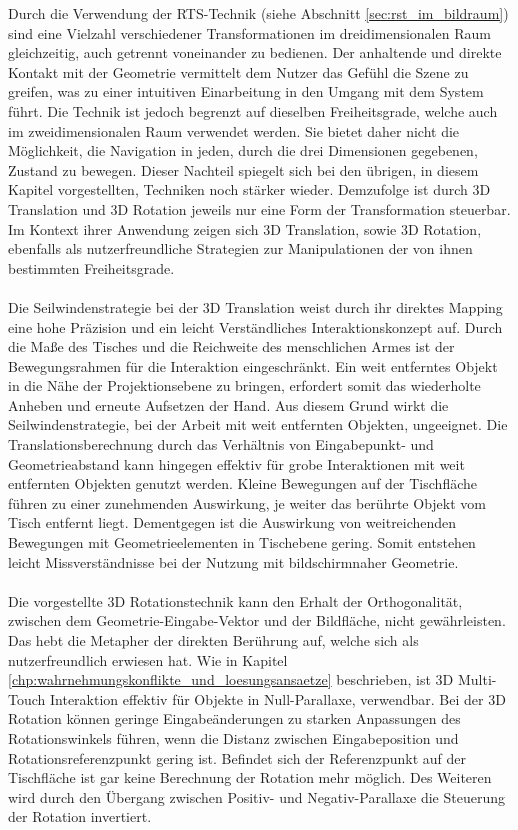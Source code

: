Durch die Verwendung der RTS-Technik (siehe Abschnitt \ref{sec:rst_im_bildraum}) sind eine Vielzahl verschiedener Transformationen im dreidimensionalen Raum gleichzeitig, auch getrennt voneinander zu bedienen. Der anhaltende und direkte Kontakt mit der Geometrie vermittelt dem Nutzer das Gefühl die Szene zu greifen, was zu einer intuitiven Einarbeitung in den Umgang mit dem System führt. Die Technik ist jedoch begrenzt auf dieselben Freiheitsgrade, welche auch im zweidimensionalen Raum verwendet werden. Sie bietet daher nicht die Möglichkeit, die Navigation in jeden, durch die drei Dimensionen gegebenen, Zustand zu bewegen. Dieser Nachteil spiegelt sich bei den übrigen, in diesem Kapitel vorgestellten, Techniken noch stärker wieder. Demzufolge ist durch 3D Translation und 3D Rotation jeweils nur eine Form der Transformation steuerbar. Im Kontext ihrer Anwendung zeigen sich 3D Translation, sowie 3D Rotation, ebenfalls als nutzerfreundliche Strategien zur Manipulationen der von ihnen bestimmten Freiheitsgrade.
\\\\
Die Seilwindenstrategie bei der 3D Translation weist durch ihr direktes Mapping eine hohe Präzision und ein leicht Verständliches Interaktionskonzept auf. Durch die Maße des Tisches und die Reichweite des menschlichen Armes ist der Bewegungsrahmen für die Interaktion eingeschränkt. Ein weit entferntes Objekt in die Nähe der Projektionsebene zu bringen, erfordert somit das wiederholte Anheben und erneute Aufsetzen der Hand. Aus diesem Grund wirkt die Seilwindenstrategie, bei der Arbeit mit weit entfernten Objekten, ungeeignet. Die Translationsberechnung durch das Verhältnis von Eingabepunkt- und Geometrieabstand kann hingegen effektiv für grobe Interaktionen mit weit entfernten Objekten genutzt werden. Kleine Bewegungen auf der Tischfläche führen zu einer zunehmenden Auswirkung, je weiter das berührte Objekt vom Tisch entfernt liegt. Dementgegen ist die Auswirkung von weitreichenden Bewegungen mit Geometrieelementen in Tischebene gering. Somit entstehen leicht Missverständnisse bei der Nutzung mit bildschirmnaher Geometrie.
\\\\
Die vorgestellte 3D Rotationstechnik kann den Erhalt der Orthogonalität, zwischen dem Geometrie-Eingabe-Vektor und der Bildfläche, nicht gewährleisten. Das hebt die Metapher der direkten Berührung auf, welche sich als nutzerfreundlich erwiesen hat. Wie in Kapitel \ref{chp:wahrnehmungskonflikte_und_loesungsansaetze} beschrieben, ist 3D Multi-Touch Interaktion effektiv für Objekte in Null-Parallaxe, verwendbar. Bei der 3D Rotation können geringe Eingabeänderungen zu starken Anpassungen des Rotationswinkels führen, wenn die Distanz zwischen Eingabeposition und Rotationsreferenzpunkt gering ist. Befindet sich der Referenzpunkt auf der Tischfläche ist gar keine Berechnung der Rotation mehr möglich. Des Weiteren wird durch den Übergang zwischen Positiv- und Negativ-Parallaxe die Steuerung der Rotation invertiert.
